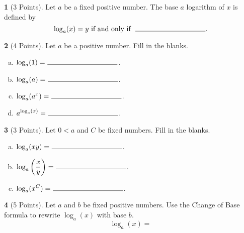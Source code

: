 \documentclass[12pt]{amsart}
\theoremstyle{definition}
\newtheorem{thm}{}
\begin{document}
\begin{thm}[3 Points]
  Let $a$ be a fixed positive number.
  The base $a$ logarithm of $x$ is defined by
  \vspace{.25in}
  $$\log_a(x) = y\  \text{if and only if}\ \ \line(1,0){100}.$$
\end{thm}

\begin{thm}[4 Points]
  Let $a$ be a positive number.  Fill in the blanks.
  \begin{enumerate}[(a)]
  \item
    \vspace{.25in}
    $\displaystyle{\log_a(1) = \ \line(1,0){100}}$.
    \vspace{.25in}
  \item
    $\displaystyle{\log_a(a) = \ \line(1,0){100}}$.
    \vspace{.25in}
  \item
    $\displaystyle{\log_a(a^x) = \ \line(1,0){100}}$.
    \vspace{.25in}
  \item
    $\displaystyle{a^{\log_a(x)} = \ \line(1,0){100}}$.
  \end{enumerate}
  \vspace{.5in}
\end{thm}

\begin{thm}[3 Points]
  Let $0 < a$ and $C$ be fixed numbers.  Fill in the blanks.
  \begin{enumerate}[(a)]
  \item
    \vspace{.25in}
    $\displaystyle{\log_a(xy) = \ \line(1,0){100}}$.
    \vspace{.25in}
  \item
    $\displaystyle{\log_a\left(\frac{x}{y}\right) = \ \line(1,0){100}}$.
    \vspace{.25in}
  \item
    $\displaystyle{\log_a(x^C) = \ \line(1,0){100}}$.
  \end{enumerate}
  \vspace{.25in}
\end{thm}

\begin{thm}[5 Points]
  Let $a$ and $b$ be fixed positive numbers.
  Use the Change of Base formula to rewrite $\log_a(x)$ with base $b$.
  \vspace{.12in}
  $$\log_a(x) = $$
  \vspace{.12in}
\end{thm}
\end{document}
